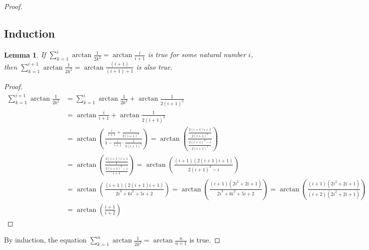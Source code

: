 \documentclass{article}
\newtheorem*{lemma*}{Lemma}
\begin{document}
\begin{proof}
    \subsection*{Induction}
    \begin{lemma*}
        If $\sum_{k=1}^{i} \arctan \frac{1}{2k^2} = \arctan \frac{i}{i+1}$ is true for some natural number $i$, then $\sum_{k=1}^{i+1} \arctan \frac{1}{2k^2} = \arctan \frac{(i+1)}{(i+1)+1}$ is also true.
    \end{lemma*}
    \begin{proof}
        \begin{align*}
            \sum_{k=1}^{i+1} \arctan \frac{1}{2k^2} 
            &= \sum_{k=1}^{i} \arctan \frac{1}{2k^2} + \arctan \frac{1}{2(i+1)^2} \\[0.5em]
            &= \arctan \frac{i}{i+1} + \arctan \frac{1}{2(i+1)^2} \\[0.5em]
            &= \arctan \left( \frac{\frac{i}{i+1} + \frac{1}{2(i+1)^2}}{1 - \frac{i}{i+1} \cdot \frac{1}{2(i+1)^2}} \right) = \arctan \left( \frac{\frac{2(i+1)i + 1}{2(i+1)^2}}{\frac{2(i+1)^3 - i}{2(i+1)^3}} \right) \\[0.5em]
            &= \arctan \left( \frac{\frac{2(i+1)i + 1}{1}}{\frac{2(i+1)^3 - i}{i+1}} \right) = \arctan \left( \frac{(i+1)(2(i+1)i + 1)}{2(i+1)^3 - i} \right) \\[0.5em]
            &= \arctan \left( \frac{(i+1)(2(i+1)i + 1)}{2i^3 + 6i^2 + 5i + 2} \right) = \arctan \left( \frac{(i+1)(2i^2 + 2i + 1)}{2i^3 + 6i^2 + 5i + 2} \right) = \arctan \left( \frac{(i+1)(2i^2 + 2i + 1)}{(i+2)(2i^2 + 2i + 1)} \right) \\[0.5em]
            &= \arctan \left( \frac{i+1}{i+2} \right)
        \end{align*}
    \end{proof}
    \noindent
    By induction, the equation $\sum_{k=1}^{n} \arctan \frac{1}{2k^2} = \arctan \frac{n}{n+1}$ is true.
\end{proof}
\end{document}
